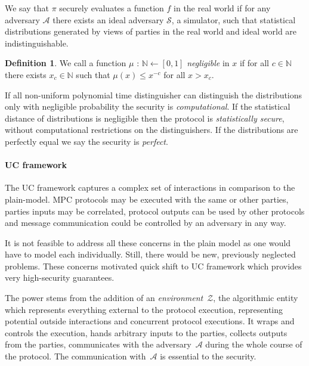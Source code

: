 \documentclass[
  digital, %
  twoside, %
  table,   %
  lof,     %
  lot,     %
]{fithesis3}
\theoremstyle{definition}
\newtheorem{definition}{Definition}
\theoremstyle{remark}
\begin{document}
We say that $\pi$ securely evaluates a function $f$ in the real world if for any adversary $\mathcal{A}$ there exists an ideal adversary $\mathcal{S}$, a simulator, such that statistical distributions generated by views of parties in the real world and ideal world are indistinguishable. 

\begin{definition}
	We call a function $\mu$ : $\mathbb{N} \leftarrow [0,1]$ \emph{negligible} in $x$ if for all $c \in \mathbb{N}$ there exists $x_c \in \mathbb{N}$ such that $\mu(x) \leq x^{-c}$ for all $x > x_c$.
\end{definition}

If all non-uniform polynomial time distinguisher can distinguish the distributions only with negligible probability the security is \emph{computational}. If the statistical distance of distributions is negligible then the protocol is \emph{statistically secure}, without computational restrictions on the distinguishers.
If the distributions are perfectly equal we say the security is \emph{perfect}. 


\paragraph{UC framework}
The UC framework captures a complex set of interactions in comparison to the plain-model. MPC protocols may be executed with the same or other parties, parties inputs may be correlated, protocol outputs can be used by other protocols and message communication could be controlled by an adversary in any way. 

It is not feasible to address all these concerns in the plain model as one would have to model each individually. Still, there would be new, previously neglected problems. These concerns motivated quick shift to UC framework which provides very high-security guarantees.

The power stems from the addition of an \emph{environment}~$\mathcal{Z}$, the algorithmic entity which represents everything external to the protocol execution, representing potential outside interactions and concurrent protocol executions. It wraps and controls the execution, hands arbitrary inputs to the parties, collects outputs from the parties, communicates with the adversary~$\mathcal{A}$ during the whole course of the protocol. The communication with~$\mathcal{A}$ is essential to the security.
\end{document}

